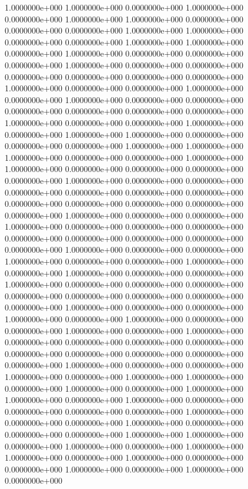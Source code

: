   1.0000000e+000  1.0000000e+000  0.0000000e+000  1.0000000e+000  0.0000000e+000
  1.0000000e+000  1.0000000e+000  0.0000000e+000  0.0000000e+000  0.0000000e+000
  1.0000000e+000  1.0000000e+000  0.0000000e+000  0.0000000e+000  1.0000000e+000
  1.0000000e+000  0.0000000e+000  1.0000000e+000  0.0000000e+000  0.0000000e+000
  0.0000000e+000  1.0000000e+000  0.0000000e+000  0.0000000e+000  0.0000000e+000
  0.0000000e+000  0.0000000e+000  0.0000000e+000  1.0000000e+000  0.0000000e+000
  0.0000000e+000  1.0000000e+000  0.0000000e+000  1.0000000e+000  0.0000000e+000
  0.0000000e+000  0.0000000e+000  0.0000000e+000  0.0000000e+000  0.0000000e+000
  1.0000000e+000  0.0000000e+000  0.0000000e+000  1.0000000e+000  0.0000000e+000
  1.0000000e+000  1.0000000e+000  0.0000000e+000  0.0000000e+000  0.0000000e+000
  1.0000000e+000  1.0000000e+000  1.0000000e+000  0.0000000e+000  0.0000000e+000
  1.0000000e+000  1.0000000e+000  0.0000000e+000  0.0000000e+000  0.0000000e+000
  0.0000000e+000  1.0000000e+000  0.0000000e+000  0.0000000e+000  0.0000000e+000
  0.0000000e+000  0.0000000e+000  0.0000000e+000  0.0000000e+000  0.0000000e+000
  0.0000000e+000  0.0000000e+000  0.0000000e+000  1.0000000e+000  0.0000000e+000
  0.0000000e+000  1.0000000e+000  0.0000000e+000  0.0000000e+000  0.0000000e+000
  0.0000000e+000  0.0000000e+000  0.0000000e+000  0.0000000e+000  0.0000000e+000
  1.0000000e+000  0.0000000e+000  0.0000000e+000  1.0000000e+000  0.0000000e+000
  0.0000000e+000  1.0000000e+000  0.0000000e+000  1.0000000e+000  0.0000000e+000
  0.0000000e+000  1.0000000e+000  0.0000000e+000  0.0000000e+000  0.0000000e+000
  0.0000000e+000  0.0000000e+000  0.0000000e+000  0.0000000e+000  0.0000000e+000
  1.0000000e+000  0.0000000e+000  0.0000000e+000  1.0000000e+000  0.0000000e+000
  1.0000000e+000  0.0000000e+000  0.0000000e+000  1.0000000e+000  0.0000000e+000
  1.0000000e+000  0.0000000e+000  0.0000000e+000  0.0000000e+000  0.0000000e+000
  0.0000000e+000  0.0000000e+000  0.0000000e+000  0.0000000e+000  0.0000000e+000
  1.0000000e+000  0.0000000e+000  0.0000000e+000  1.0000000e+000  0.0000000e+000
  1.0000000e+000  1.0000000e+000  0.0000000e+000  1.0000000e+000  0.0000000e+000
  1.0000000e+000  1.0000000e+000  0.0000000e+000  1.0000000e+000  0.0000000e+000
  0.0000000e+000  0.0000000e+000  0.0000000e+000  1.0000000e+000  0.0000000e+000
  0.0000000e+000  1.0000000e+000  0.0000000e+000  0.0000000e+000  0.0000000e+000
  1.0000000e+000  1.0000000e+000  0.0000000e+000  1.0000000e+000  0.0000000e+000
  1.0000000e+000  1.0000000e+000  0.0000000e+000  1.0000000e+000  0.0000000e+000
  0.0000000e+000  1.0000000e+000  0.0000000e+000  1.0000000e+000  0.0000000e+000
